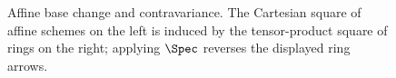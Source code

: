 \begin{figure}[htbp]
\centering
{}
\qquad
{}
\caption{Affine base change and contravariance. The Cartesian square of affine schemes on the left is induced by the tensor-product square of rings on the right; applying $\Spec$ reverses the displayed ring arrows.}
\label{fig:vi24-affine-contravariance-base-change}
\end{figure}
